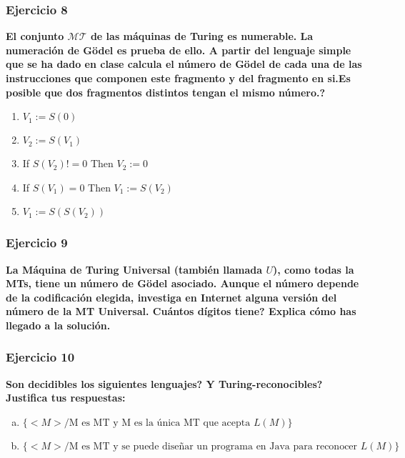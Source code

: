 \documentclass{article}
\begin{document}
\subsubsection*{Ejercicio 8} \textbf{El conjunto $\mathcal{MT}$ de las máquinas de Turing  es numerable. La numeración de Gödel es prueba de ello. A partir del lenguaje simple que se ha dado en clase calcula el  número de Gödel de cada una de las instrucciones que componen este fragmento y del fragmento en si.Es posible que dos fragmentos distintos tengan el mismo número.?}
\begin{enumerate}
\item[] $V_1:=S(0)$
\item[] $V_2:=S(V_1)$ 
\item[] If $S(V_2)!=0$ Then $V_2:=0$
\item[] If $S(V_1)=0$ Then $V_1:=S(V_2)$
\item[] $V_1:=S(S(V_2))$
\end{enumerate}


\subsubsection*{Ejercicio 9} \textbf{La Máquina de Turing Universal (también llamada $U$), como todas la MTs, tiene un número de Gödel asociado. Aunque el número depende de la codificación elegida, investiga en Internet alguna versión del número de la MT Universal. Cuántos dígitos tiene? Explica cómo has llegado a la solución. 
}

\subsubsection*{Ejercicio 10}
\textbf{Son decidibles los siguientes lenguajes? Y Turing-reconocibles? Justifica tus respuestas:}

\begin{enumerate}[a)]
\item  $\{<M> /\mbox{M es MT y  M es la única MT que acepta } L(M)\}$ 
\item $\{<M> /\mbox{M es MT  y  se puede diseñar un programa en Java para reconocer } L(M)\}$

\end{enumerate}

%
\end{document}
